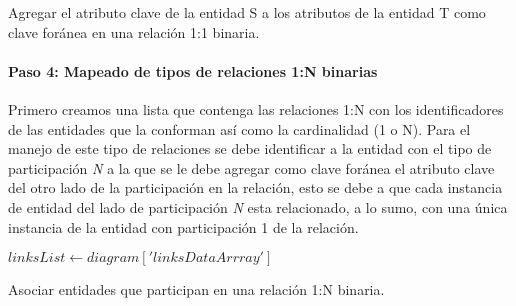 \begin{algorithm}[H]

  \caption{Agregar el atributo clave de la entidad S a los atributos de la entidad T como clave foránea en una relación 1:1 binaria.}
\end{algorithm}

\paragraph*{Paso 4: Mapeado de tipos de relaciones 1:N binarias}

Primero creamos una lista que contenga las relaciones 1:N con los identificadores de las entidades que la conforman así como la cardinalidad (1 o N). Para el manejo de este tipo de relaciones se debe identificar a la entidad con el tipo de participación \textit{N} a la que se le debe agregar como clave foránea el atributo clave del otro lado de la participación en la relación, esto se debe a que cada instancia de entidad del lado de participación \textit{N} esta relacionado, a lo sumo, con una única instancia de la entidad con participación 1 de la relación.

\begin{algorithm}[H]

  $linksList \gets diagram['linksDataArrray']$\\
  \caption{Asociar entidades que participan en una relación 1:N binaria.}
\end{algorithm}

